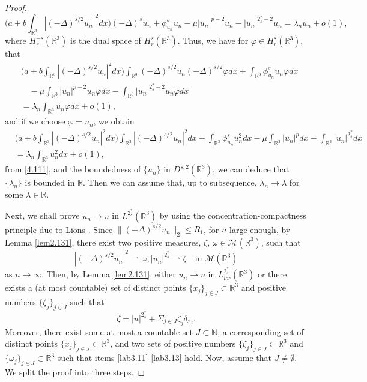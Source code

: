 \documentclass[11pt]{article}
\numberwithin{equation}{section}
\begin{document}
\begin{proof}
\[  %
\Big(a+b\int_{\mathbb{R}^3}|(-\Delta)^{s/2}u_n|^2dx\Big)
 (-\Delta)^su_n+\phi^s_{u_n}u_n
-\mu |u_n|^{p-2}u_n-|u_n|^{2^*_s-2}u_n=\lambda_n u_n+o(1),
\]
where $H^{-s}_{r}(\mathbb{R}^3)$ is the dual space of $H^{s}_{r}(\mathbb{R}^3)$.
Thus, we have for $\varphi \in H^s_{r}(\mathbb{R}^3)$, that
\begin{equation}\label{4.11}
\begin{split}
&\Big(a+b\int_{\mathbb{R}^3}|(-\Delta)^{s/2}u_n|^2dx\Big)
 \int_{\mathbb{R}^3}(-\Delta)^{s/2}u_n (-\Delta)^{s/2}\varphi dx
 +\int_{\mathbb{R}^3}\phi^s_{u_n}u_n\varphi dx \\
&\quad -\mu \int_{\mathbb{R}^3}|u_n|^{p-2}u_n\varphi dx
 -\int_{\mathbb{R}^3}|u_n|^{2^*_s-2}u_n\varphi dx\\
&=\lambda_n \int_{\mathbb{R}^3} u_n\varphi dx+o(1),
\end{split}
\end{equation}
and if we choose $\varphi=u_n$, we obtain
\begin{equation}\label{4.111}
\begin{split}
&\Big(a+b\int_{\mathbb{R}^3}|(-\Delta)^{s/2}u_n|^2dx\Big)
 \int_{\mathbb{R}^3}|(-\Delta)^{s/2}u_n|^2 dx
 +\int_{\mathbb{R}^3}\phi^s_{u_n}{u^2_n}dx
 -\mu \int_{\mathbb{R}^3}|u_n|^{p}dx
 -\int_{\mathbb{R}^3}|u_n|^{2^*_s} dx \\
&=\lambda_n \int_{\mathbb{R}^3} {u^2_n} dx+o(1) ,
\end{split}
\end{equation}
from \eqref{4.111}, and the boundedness of $\{u_n\}$ in $D^{s, 2}(\mathbb{R}^3)$,
we can deduce that $\{\lambda_n\}$ is bounded in $\mathbb{R}$.
Then we can assume that, up to subsequence, $\lambda_n\to \lambda$ for some
$\lambda \in {\mathbb{R}}$.

Next, we shall prove $u_n\to u$ in $L^{2^*_s}(\mathbb{R}^3)$ by using  the
concentration-compactness principle due to Lions {\cite{L7889}}.
Since $\|(-\Delta)^{s/2}u_n\|_2\leq {R}_1$, for $n$ large enough,
 by Lemma \ref{lem2.131}, there exist two positive measures, $\zeta$,
 $\omega\in \mathcal{M}(\mathbb{R}^3)$, such that
\begin{equation}\label{4.16}
|(-\Delta)^{s/2}u_n|^2\rightharpoonup \omega, |u_n|^{2^*_s}\rightharpoonup\zeta
\quad\text{in }\mathcal{M}(\mathbb{R}^3)
\end{equation}
as $n\to \infty$. Then, by Lemma \ref{lem2.131}, either $u_n\to u$ in
$L^{2^*_s}_{loc}(\mathbb{R}^3)$ or there exists a (at most countable) set of
distinct points $\{x_j\}_{j\in J}\subset \mathbb{R}^3$ and positive numbers
$\{\zeta_j\}_{j\in J}$ such that
$$
\zeta=|u|^{2^*_s}+\Sigma_{j\in J}\zeta_j \delta_{x_j}.
$$
Moreover, there exist some at most a countable set $J\subset \mathbb{N}$,
a corresponding set of distinct points $\{x_j\}_{j\in J}\subset \mathbb{R}^3$,
and two sets of positive numbers  $\{\zeta_j\}_{j\in J}\subset \mathbb{R}^3$ and
$\{\omega_j\}_{j\in J}\subset \mathbb{R}^3$ such that items
\eqref{lab3.11}-\eqref{lab3.13} hold. Now, assume that $J\neq \emptyset$.
We split the proof into three steps.
\smallskip


\end{proof}
\end{document}
